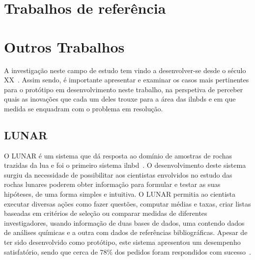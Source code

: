 \section{Trabalhos de referência}
\label{sec:chap03_mainmarketstudy}
\tbd

\section{Outros Trabalhos}
\label{sec:chap03_marketstudy}
A investigação neste campo de estudo tem vindo a desenvolver-se desde o século XX~\parencite{survey_nlidb}. Assim sendo, é importante apresentar e examinar os casos mais pertinentes para o protótipo em desenvolvimento neste trabalho, na perspetiva de perceber quais as inovações que cada um deles trouxe para a área das \glspl{ilnbd} e em que medida se enquadram com o problema em resolução.

\subsection{LUNAR}
O LUNAR é um sistema que dá resposta ao domínio de amostras de rochas trazidas da lua e foi o primeiro sistema \gls{ilnbd}~\parencite{nlidb_brief_review, survey_nlidb}. O desenvolvimento deste sistema surgiu da necessidade de possibilitar aos cientistas envolvidos no estudo das rochas lunares poderem obter informação para formular e testar as suas hipóteses, de uma forma simples e intuitiva. O LUNAR permitia ao cientista executar diversas ações como fazer questões, computar médias e taxas, criar listas baseadas em critérios de seleção ou comparar medidas de diferentes investigadores, usando informação de duas bases de dados, uma contendo dados de análises químicas e a outra com dados de referências bibliográficas. Apesar de ter sido desenvolvido como protótipo, este sistema apresentou um desempenho satisfatório, sendo que cerca de 78\% dos pedidos foram respondidos com sucesso~\parencite{lunar_sciences_nlis}.

